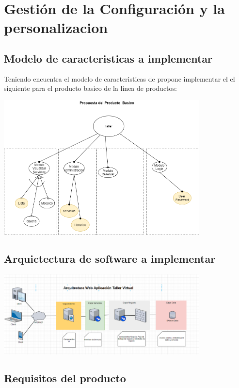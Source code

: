 \documentclass[10pt,a4paper,openany]{book}
\begin{document}
\chapter{Gestión de la Configuración y la personalizacion}



\section{Modelo de caracteristicas a implementar }

Teniendo encuentra el modelo de caracteristicas de propone implementar el el siguiente para el producto basico de la linea de productos:

\includegraphics[width=0.8\textwidth]{oc_2}

\section{Arquictectura de software a implementar }

\includegraphics[width=0.8\textwidth]{oc_img3}


\section{Requisitos del producto}
\end{document}
